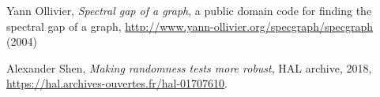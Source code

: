 \documentclass[12pt,a4paper,fullpage]{article}
\begin{document}
\begin{thebibliography}{9}
Yann Ollivier,  \emph{Spectral gap of a graph}, a public domain code for finding the spectral gap of a graph,  \url{http://www.yann-ollivier.org/specgraph/specgraph} (2004)

Alexander Shen, \emph{Making randomness tests more robust}, HAL archive, 2018, \url{https://hal.archives-ouvertes.fr/hal-01707610}.


\end{thebibliography}
\end{document}
